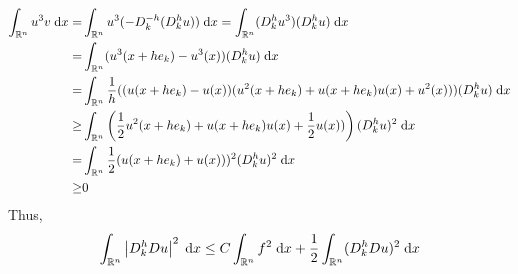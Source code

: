 \begin{align*}
  \int_{\reals^n} u^3 v \dx = &\int_{\reals^n} u^3 (-\diffquotdir{-h}{k} (\diffquotdir{h}{k} u)) \dx
    = \int_{\reals^n} (\diffquotdir{h}{k} u^3) (\diffquotdir{h}{k} u) \dx\\
    = &\int_{\reals^n} (u^3(x + h e_k) - u^3(x)) (\diffquotdir{h}{k} u) \dx\\
    = &\int_{\reals^n} \frac{1}{h}((u(x + h e_k) - u(x)) (u^2(x + h e_k) + u(x + h e_k) u(x) + u^2(x))) (\diffquotdir{h}{k} u) \dx\\
 \geq &\int_{\reals^n} \left(\frac{1}{2} u^2(x + h e_k) + u(x + h e_k) u(x) + \frac{1}{2} u(x)) \right) (\diffquotdir{h}{k} u)^2 \dx\\
    = &\int_{\reals^n} \frac{1}{2}(u(x + h e_k) + u(x)))^2 (\diffquotdir{h}{k} u)^2 \dx\\
    \geq &0
\end{align*}
Thus,
\begin{align*}
  \int_{\reals^n} \left|\diffquotdir{h}{k} \grad u \right|^2 \dx
    \leq C \int_{\reals^n} f^2 \dx
       + \frac{1}{2} \int_{\reals^n} (\diffquotdir{h}{k} \grad u)^2 \dx
\end{align*}
